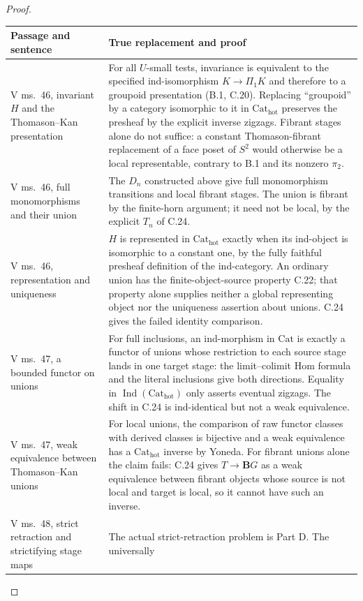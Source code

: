 \begin{proof}
\small
\begin{longtable}{@{}p{}p{}@{}}
\toprule
Passage and sentence & True replacement and proof\\
\midrule
\endhead
V ms.~46, invariant $H$ and the Thomason--Kan presentation &
For all $U$-small tests, invariance is equivalent to the specified
ind-isomorphism $K\to\Pi_1K$ and therefore to a groupoid
presentation (B.1, C.20). Replacing ``groupoid'' by a category
isomorphic to it in $\mathrm{Cat}_{\mathrm{hot}}$ preserves the
presheaf by the explicit inverse zigzags. Fibrant stages alone do
not suffice: a constant Thomason-fibrant replacement of a face
poset of $S^2$ would otherwise be a local representable, contrary
to B.1 and its nonzero $\pi_2$.\\
V ms.~46, full monomorphisms and their union &
The $D_n$ constructed above give full monomorphism transitions
and local fibrant stages. The union is fibrant by the finite-horn
argument; it need not be local, by the explicit $T_n$ of C.24.\\
V ms.~46, representation and uniqueness &
$H$ is represented in $\mathrm{Cat}_{\mathrm{hot}}$ exactly
when its ind-object is isomorphic to a constant one, by the
fully faithful presheaf definition of the ind-category. An
ordinary union has the finite-object-source property C.22;
that property alone supplies neither a global representing
object nor the uniqueness assertion about unions. C.24 gives
the failed identity comparison.\\
V ms.~47, a bounded functor on unions &
For full inclusions, an ind-morphism in $\mathrm{Cat}$ is
exactly a functor of unions whose restriction to each source
stage lands in one target stage: the limit--colimit Hom formula
and the literal inclusions give both directions. Equality in
$\operatorname{Ind}(\mathrm{Cat}_{\mathrm{hot}})$ only asserts
eventual zigzags. The shift in C.24 is ind-identical but not a
weak equivalence.\\
V ms.~47, weak equivalence between Thomason--Kan unions &
For local unions, the comparison of raw functor classes with
derived classes is bijective and a weak equivalence has a
$\mathrm{Cat}_{\mathrm{hot}}$ inverse by Yoneda. For fibrant
unions alone the claim fails: C.24 gives $T\to\mathbf B G$
as a weak equivalence between fibrant objects whose source is
not local and target is local, so it cannot have such an inverse.\\
V ms.~48, strict retraction and strictifying stage maps &
The actual strict-retraction problem is Part D. The universally

\end{longtable}
\end{proof}
